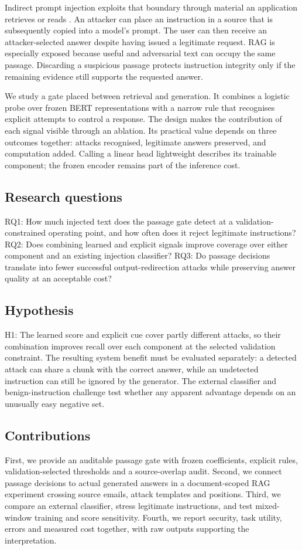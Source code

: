 \documentclass[conference,a4paper]{IEEEtran}
\begin{document}
Indirect prompt injection exploits that boundary through material an application retrieves or reads \cite{ref4}. An attacker can place an instruction in a source that is subsequently copied into a model's prompt. The user can then receive an attacker-selected answer despite having issued a legitimate request. RAG is especially exposed because useful and adversarial text can occupy the same passage. Discarding a suspicious passage protects instruction integrity only if the remaining evidence still supports the requested answer.

We study a gate placed between retrieval and generation. It combines a logistic probe over frozen BERT representations with a narrow rule that recognises explicit attempts to control a response. The design makes the contribution of each signal visible through an ablation. Its practical value depends on three outcomes together: attacks recognised, legitimate answers preserved, and computation added. Calling a linear head lightweight describes its trainable component; the frozen encoder remains part of the inference cost.

\subsection{Research questions}
RQ1: How much injected text does the passage gate detect at a validation-constrained operating point, and how often does it reject legitimate instructions?
RQ2: Does combining learned and explicit signals improve coverage over either component and an existing injection classifier?
RQ3: Do passage decisions translate into fewer successful output-redirection attacks while preserving answer quality at an acceptable cost?

\subsection{Hypothesis}
H1: The learned score and explicit cue cover partly different attacks, so their combination improves recall over each component at the selected validation constraint. The resulting system benefit must be evaluated separately: a detected attack can share a chunk with the correct answer, while an undetected instruction can still be ignored by the generator. The external classifier and benign-instruction challenge test whether any apparent advantage depends on an unusually easy negative set.

\subsection{Contributions}
First, we provide an auditable passage gate with frozen coefficients, explicit rules, validation-selected thresholds and a source-overlap audit. Second, we connect passage decisions to actual generated answers in a document-scoped RAG experiment crossing source emails, attack templates and positions. Third, we compare an external classifier, stress legitimate instructions, and test mixed-window training and score sensitivity. Fourth, we report security, task utility, errors and measured cost together, with raw outputs supporting the interpretation.
\end{document}

